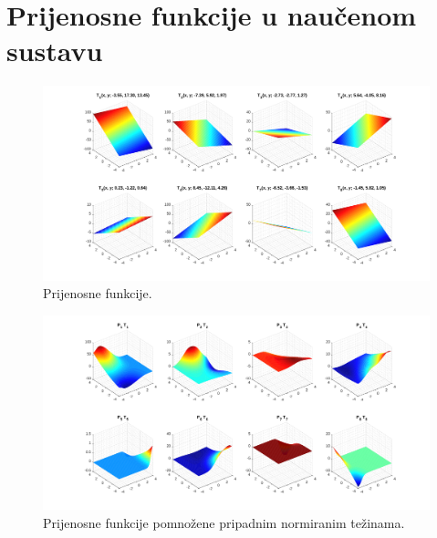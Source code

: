 \documentclass[12pt, a4paper]{article}
\begin{document}
\section*{Prijenosne funkcije u naučenom sustavu}

\begin{figure}[H]
  \centering
  \includegraphics[width=\linewidth]{T.pdf}
  \caption{Prijenosne funkcije.}
\end{figure}

\begin{figure}[H]
  \centering
  \includegraphics[width=\linewidth]{PT.pdf}
  \caption{Prijenosne funkcije pomnožene pripadnim normiranim težinama.}
\end{figure}
\end{document}
